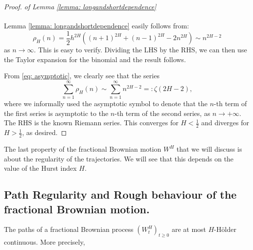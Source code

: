 \documentclass[a4paper,italian,11pt]{book}
\theoremstyle{plain}
\theoremstyle{remark}
\theoremstyle{plain}
\begin{document}
\begin{proof} \textit{of Lemma \ref{lemma: longandshortdependence}}
\\\
\\
Lemma \ref{lemma: longandshortdependence} easily follows from:
\begin{equation}
    \label{eq: asymptotic} 
    \rho_H(n) = \frac{1}{2}h^{2H}((n+1)^{2H} + (n-1)^{2H} - 2n^{2H}) \sim n^{2H-2}
\end{equation}
as $n \to \infty$. This is easy to verify. Dividing the LHS by the RHS, we can then use the Taylor expansion for the binomial and the result follows.

From \eqref{eq: asymptotic}, we clearly see that the series
\begin{equation}
    \label{eq: zetaRiemann}
    \sum_{n=1}^\infty \rho_H(n) \sim \sum_{n=1}^\infty n^{2H-2}=: \zeta(2H-2),
\end{equation}
 where we informally used the asymptotic symbol to denote that the $n$-th term of the first series is asymptotic to the $n$-th term of the second series, as $n\to +\infty$. \\
The RHS is the known Riemann series. This converges for $H<\frac{1}{2}$ and diverges for $H>\frac{1}{2}$, as desired. 
\end{proof}

The last property of the fractional Brownian motion $W^H$ that we will discuss is about the regularity of the trajectories. We will see that this depends on the value of the Hurst index $H$.

\subsection{Path Regularity and Rough behaviour of the fractional Brownian motion.}

The paths of a fractional Brownian process $(W^H_t)_{t\ge 0}$ are at most $H$-Hölder continuous. More precisely,
\end{document}
